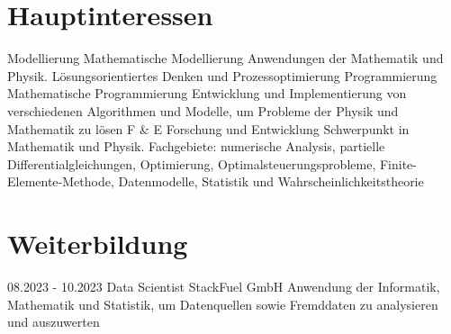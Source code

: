 \documentclass[a4paper]{cv-class}
\begin{document}
\section{Hauptinteressen}
\begin{entrylist}
  
\entry
    {Modellierung}
    {Mathematische Modellierung}
    {}
    {Anwendungen der Mathematik und Physik. Lösungsorientiertes Denken und Prozessoptimierung}
\entry
    {Programmierung}
    {\,Mathematische Programmierung}
    {}
    {Entwicklung und Implementierung von verschiedenen Algorithmen und Modelle, um Probleme der Physik und Mathematik zu lösen }
\entry
    {F \& E}
    {Forschung und Entwicklung}
    {}
    {Schwerpunkt in Mathematik und Physik. Fachgebiete: numerische Analysis, partielle Differentialgleichungen, Optimierung, Optimalsteuerungsprobleme, Finite-Elemente-Methode, Datenmodelle, Statistik und Wahrscheinlichkeitstheorie}

  
 
\end{entrylist}

\newpage
\section{Weiterbildung}
\begin{entrylist}
\entry
{08.2023 - 10.2023}
{Data Scientist}
{StackFuel GmbH}
{Anwendung der Informatik, Mathematik und Statistik, um Datenquellen sowie Fremddaten zu analysieren und auszuwerten}
\end{entrylist}
\end{document}
